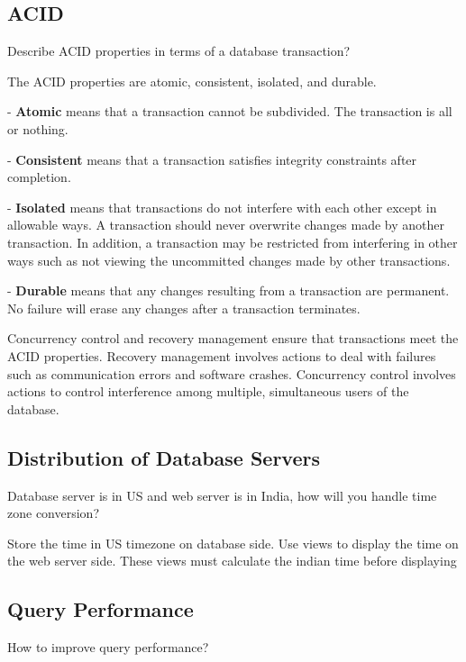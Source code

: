 \subsection{ACID}
Describe ACID properties in terms of a database transaction?

The ACID properties are atomic, consistent, isolated, and durable. 

- {\bf Atomic} means that a transaction cannot be subdivided. The transaction is all or nothing. 

- {\bf Consistent} means that a transaction satisfies integrity constraints after completion. 

- {\bf Isolated} means that transactions do not interfere with each other except in allowable ways. A transaction should never overwrite changes made by another transaction. In 
addition, a transaction may be restricted from interfering in other ways such as not viewing the uncommitted changes made by other transactions. 

- {\bf Durable} means that any changes resulting from a transaction are permanent. No failure will erase any changes after a transaction terminates. 

Concurrency control and recovery management ensure that transactions meet the ACID properties. Recovery management involves actions to deal with failures such as communication 
errors and software crashes. Concurrency control involves actions to control interference among multiple, simultaneous users of the database.

\subsection{Distribution of Database Servers}
Database server is in US and web server is in India, how will you handle time zone conversion?

Store the time in US timezone on database side. Use views to display the time on the web server side. These views must calculate the indian time before displaying

\subsection{Query Performance}
How to improve query performance?

